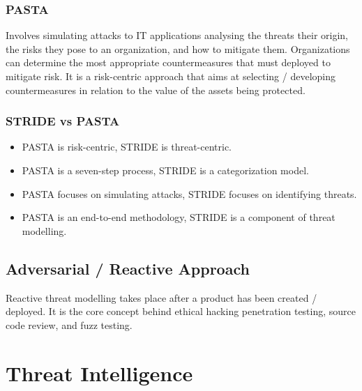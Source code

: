 \documentclass[12pt letter]{report}
\begin{document}
\subsubsection{PASTA}

Involves simulating attacks to IT applications analysing the threats
their origin, the risks they pose to an organization, and how to
mitigate them. Organizations can determine the most appropriate
countermeasures that must deployed to mitigate risk. It is a
risk-centric approach that aims at selecting / developing
countermeasures in relation to the value of the assets being protected.

\subsubsection{STRIDE vs PASTA}

\begin{itemize}
  \item PASTA is risk-centric, STRIDE is threat-centric.
  \item PASTA is a seven-step process, STRIDE is a categorization
    model.
  \item PASTA focuses on simulating attacks, STRIDE focuses on identifying
    threats.
  \item PASTA is an end-to-end methodology, STRIDE is a component of threat
    modelling.
\end{itemize}

\subsection{Adversarial / Reactive Approach}

Reactive threat modelling takes place after a product has been
created / deployed. It is the core concept behind ethical hacking
penetration testing, source code review, and fuzz testing.


\section{Threat Intelligence}

\end{document}
